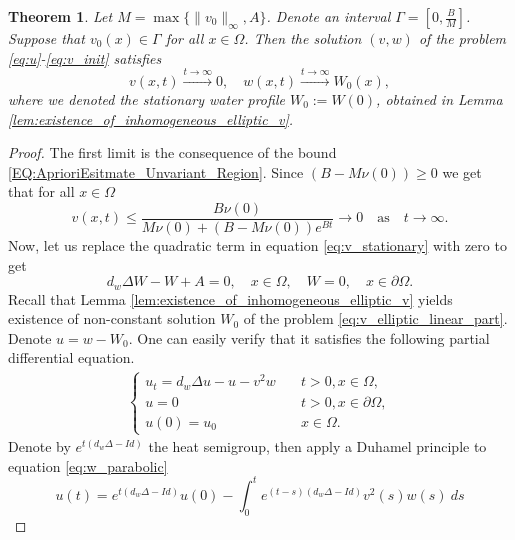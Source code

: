 \documentclass[11pt, a4paper]{article}
\theoremstyle{break}
\newtheorem{thm}{Theorem}[section]
\theoremstyle{break}
\theoremstyle{break}
\theoremstyle{break}
\theoremstyle{break}
\theoremstyle{break}
\theoremstyle{break}
\begin{document}
\begin{thm}
    \label{thm:Exinction-Of-Vegetation}
    Let $M = \max\{\|v_0\|_\infty, A\}$. Denote an interval $\Gamma  = \left[0, \frac{B}{M}\right]$. Suppose that $v_0(x) \in \Gamma$ for all $x \in \Omega$. Then the solution $(v, w)$ of the problem \eqref{eq:u}-\eqref{eq:v_init} satisfies
    \begin{equation}
        v(x,t) \xrightarrow{t \rightarrow \infty} 0, \quad w(x,t) \xrightarrow{t \rightarrow \infty} W_0(x),
    \end{equation}
    where we denoted the stationary water profile $W_0 := W(0)$, obtained in Lemma \ref{lem:existence_of_inhomogeneous_elliptic_v}.
\end{thm}
\begin{proof}
    The first limit is the consequence of the bound \eqref{EQ:AprioriEsitmate_Unvariant_Region}. Since $(B - M\nu(0)) \geq 0$ we get that for all $x \in \Omega$
    \begin{equation*}
        v(x,t) \leq \frac{B\nu(0)}{M \nu(0) + 
        (B - M \nu(0)) e^{B t}} \rightarrow 0 \quad \text{as} \quad t \rightarrow \infty.
    \end{equation*}
    Now, let us replace the quadratic term in equation \eqref{eq:v_stationary} with zero to get
    \begin{equation}
        \label{eq:v_elliptic_linear_part}
        d_w \Delta W - W + A = 0, \quad x \in \Omega, \quad W = 0, \quad x \in \partial \Omega.
    \end{equation}
    Recall that Lemma \ref{lem:existence_of_inhomogeneous_elliptic_v} yields existence of non-constant solution $W_0$ of the problem \eqref{eq:v_elliptic_linear_part}. Denote $u = w - W_0$. One can easily verify that it satisfies the following partial differential equation.
    \begin{align}
        \label{eq:w_parabolic}
        \begin{cases}
            u_t = d_w\Delta u - u - v^2w &\quad t > 0, x \in \Omega, \\
            u = 0 &\quad t > 0, x \in \partial\Omega, \\
            u(0) = u_0 &\quad x \in \Omega.
        \end{cases}
    \end{align}
    Denote by $e^{t(d_w\Delta - Id)}$ the heat semigroup, then apply a Duhamel principle to equation \eqref{eq:w_parabolic}
    \begin{equation}
        \label{eq:w_duhmel_principle}
        u(t) = e^{t(d_w\Delta - Id)} u(0) - \int_0^t e^{(t-s)(d_w\Delta - Id)} v^2(s) w(s)\:ds

\end{equation}
\end{proof}
\end{document}
